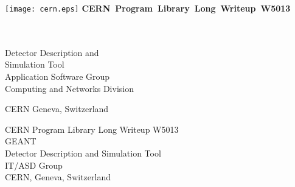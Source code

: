  
 
\begin{titlepage}
\vspace*{-23mm}%
\texttt{[image: cern.eps]}
\hfill
{}\hbox{\Large\bf CERN Program Library Long Writeup W5013}
\hfill\mbox{}
\begin{center}
\mbox{}\\[6mm]
\mbox{}\\[3cm]
{\Huge Detector Description and}\\[2cm]
{\Huge Simulation Tool}\\[4cm]
{\Large Application Software Group}\\[6mm]
{\Large Computing and Networks Division}\\[2cm]
\end{center}
\vfill
\begin{center}\Large CERN Geneva, Switzerland\end{center}
\begin{htmlonly}
\begin{center}
\Large CERN Program Library Long Writeup W5013\\[1cm]
\Huge GEANT\\[2cm]
\Large Detector Description and Simulation Tool\\[1cm]
\large IT/ASD Group\\
\large CERN, Geneva, Switzerland
\end{center}
\end{htmlonly}
\end{titlepage}

